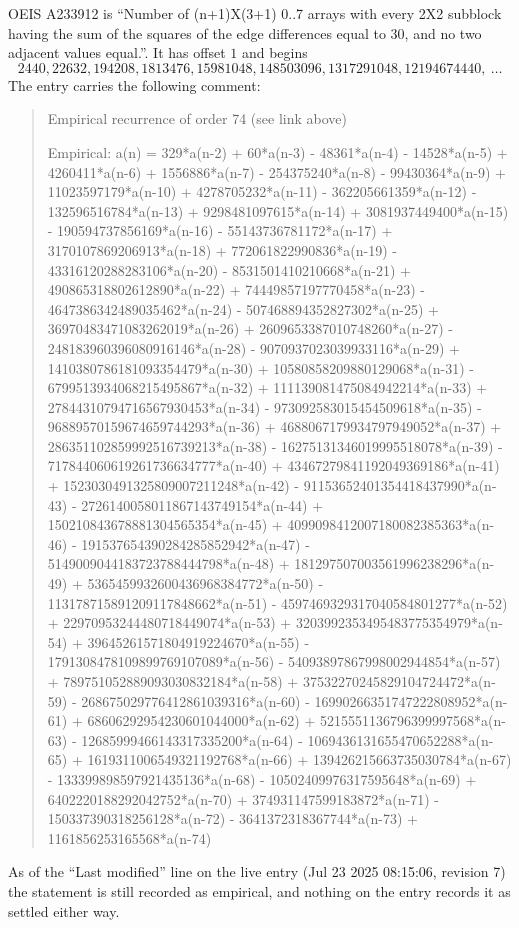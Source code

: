 \documentclass[11pt,a4paper]{article}
\theoremstyle{plain}
\theoremstyle{definition}
\begin{document}
OEIS A233912 is ``Number of (n+1)X(3+1) 0..7 arrays with every 2X2 subblock having the sum of the squares of the edge differences equal to 30, and no two adjacent values equal.''. It has offset $1$ and begins
\[
2440, 22632, 194208, 1813476, 15981048, 148503096, 1317291048, 12194674440,\ \dots
\]
The entry carries the following comment:
\begin{quote}\small
Empirical recurrence of order 74 (see link above)

Empirical: a(n) = 329*a(n-2) + 60*a(n-3) - 48361*a(n-4) - 14528*a(n-5) + 4260411*a(n-6) + 1556886*a(n-7) - 254375240*a(n-8) - 99430364*a(n-9) + 11023597179*a(n-10) + 4278705232*a(n-11) - 362205661359*a(n-12) - 132596516784*a(n-13) + 9298481097615*a(n-14) + 3081937449400*a(n-15) - 190594737856169*a(n-16) - 55143736781172*a(n-17) + 3170107869206913*a(n-18) + 772061822990836*a(n-19) - 43316120288283106*a(n-20) - 8531501410210668*a(n-21) + 490865318802612890*a(n-22) + 74449857197770458*a(n-23) - 4647386342489035462*a(n-24) - 507468894352827302*a(n-25) + 36970483471083262019*a(n-26) + 2609653387010748260*a(n-27) - 248183960396080916146*a(n-28) - 9070937023039933116*a(n-29) + 1410380786181093354479*a(n-30) + 10580858209880129068*a(n-31) - 6799513934068215495867*a(n-32) + 111139081475084942214*a(n-33) + 27844310794716567930453*a(n-34) - 973092583015454509618*a(n-35) - 96889570159674659744293*a(n-36) + 4688067179934797949052*a(n-37) + 286351102859992516739213*a(n-38) - 16275131346019995518078*a(n-39) - 717844060619261736634777*a(n-40) + 43467279841192049369186*a(n-41) + 1523030491325809007211248*a(n-42) - 91153652401354418437990*a(n-43) - 2726140058011867143749154*a(n-44) + 150210843678881304565354*a(n-45) + 4099098412007180082385363*a(n-46) - 191537654390284285852942*a(n-47) - 5149009044183723788444798*a(n-48) + 181297507003561996238296*a(n-49) + 5365459932600436968384772*a(n-50) - 113178715891209117848662*a(n-51) - 4597469329317040584801277*a(n-52) + 22970953244480718449074*a(n-53) + 3203992353495483775354979*a(n-54) + 39645261571804919224670*a(n-55) - 1791308478109899769107089*a(n-56) - 54093897867998002944854*a(n-57) + 789751052889093030832184*a(n-58) + 37532270245829104724472*a(n-59) - 268675029776412861039316*a(n-60) - 16990266351747222808952*a(n-61) + 68606292954230601044000*a(n-62) + 5215551136796399997568*a(n-63) - 12685999466143317335200*a(n-64) - 1069436131655470652288*a(n-65) + 1619311006549321192768*a(n-66) + 139426215663735030784*a(n-67) - 133399898597921435136*a(n-68) - 10502409976317595648*a(n-69) + 6402220188292042752*a(n-70) + 374931147599183872*a(n-71) - 150337390318256128*a(n-72) - 3641372318367744*a(n-73) + 1161856253165568*a(n-74)
\end{quote}
As of the ``Last modified'' line on the live entry (Jul 23 2025 08:15:06, revision 7) the statement is
still recorded as empirical, and nothing on the entry records it as settled either way.
\end{document}
